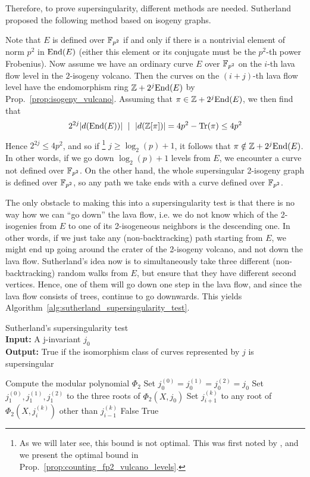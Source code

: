Therefore, to prove supersingularity, different methods are needed.
Sutherland \cite{sutherland_supersingularity_test} proposed the following method based on isogeny graphs.

Note that $E$ is defined over $\mathbb{F}_{p^2}$ if and only if there is a nontrivial element of norm $p^2$ in $\mathrm{End}(E)$ (either this element or its conjugate must be the $p^2$-th power Frobenius).
Now assume we have an ordinary curve $E$ over $\mathbb{F}_{p^2}$ on the $i$-th lava flow level in the $2$-isogeny volcano.
Then the curves on the $(i + j)$-th lava flow level have the endomorphism ring $\mathbb{Z} + 2^j\mathrm{End}(E)$ by Prop.~\ref{prop:isogeny_vulcano}.
Assuming that $\pi \in \mathbb{Z} + 2^j\mathrm{End}(E)$, we then find that
\begin{equation*}
    2^{2j} |d(\mathrm{End}(E))| \ \mid \  |d(\mathbb{Z}[\pi])| = 4p^2 - \mathrm{Tr}(\pi) \leq 4p^2
\end{equation*}
Hence $2^{2j} \leq 4p^2$, and so if
\footnote{As we will later see, this bound is not optimal. This was first noted by \cite{fp_supersingularity_tests}, and we present the optimal bound in Prop.~\ref{prop:counting_fp2_vulcano_levels}.}
$j \geq \log_2(p) + 1$, it follows that $\pi \notin \mathbb{Z} + 2^j\mathrm{End}(E)$.
In other words, if we go down $\log_2(p) + 1$ levels from $E$, we encounter a curve not defined over $\mathbb{F}_{p^2}$.
On the other hand, the whole supersingular 2-isogeny graph is defined over $\mathbb{F}_{p^2}$, so any path we take ends with a curve defined over $\mathbb{F}_{p^2}$.

The only obstacle to making this into a supersingularity test is that there is no way how we can ``go down'' the lava flow, i.e. we do not know which of the 2-isogenies from $E$ to one of its 2-isogeneous neighbors is the descending one.
In other words, if we just take any (non-backtracking) path starting from $E$, we might end up going around the crater of the 2-isogeny volcano, and not down the lava flow.
Sutherland's idea now is to simultaneously take three different (non-backtracking) random walks from $E$, but ensure that they have different second vertices.
Hence, one of them will go down one step in the lava flow, and since the lava flow consists of trees, continue to go downwards.
This yields Algorithm~\ref{alg:sutherland_supersingularity_test}.
\begin{algorithm}
\caption{\label{alg:sutherland_supersingularity_test} Sutherland's supersingularity test\\
\textbf{Input:} A j-invariant $j_0$\\
\textbf{Output:} True if the isomorphism class of curves represented by $j$ is supersingular}
\begin{algorithmic}[1]
\State Compute the modular polynomial $\Phi_2$
\State Set $j_0^{(0)} = j_0^{(1)} = j_0^{(2)} = j_0$
\State Set $j_1^{(0)}, j_1^{(1)}, j_1^{(2)}$ to the three roots of $\Phi_2(X, j_0)$
        \State Set $j_{i + 1}^{(k)}$ to any root of $\Phi_2(X, j_i^{(k)})$ other than $j_{i - 1}^{(k)}$
            \Return False
        \EndIf
    \EndFor
\EndFor
\State \Return True
\end{algorithmic}
\end{algorithm}

